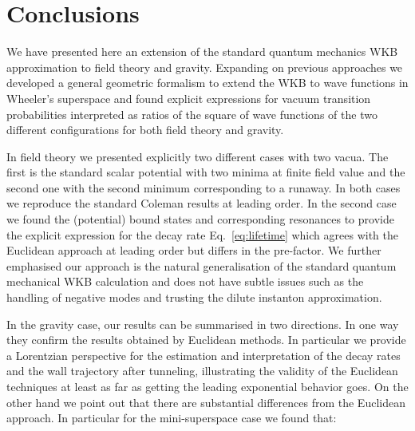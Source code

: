\documentclass[a4paper,11pt]{article}
\numberwithin{equation}{section}
\begin{document}
\section{Conclusions}

We have presented here an extension of the standard quantum mechanics WKB approximation to field theory and gravity. Expanding on previous approaches we developed a general geometric formalism to extend the WKB to wave functions in Wheeler's superspace and found explicit expressions for vacuum transition probabilities interpreted as ratios of the square of wave functions of the two different configurations for both field theory and gravity. 

In field theory we presented explicitly two different cases with two vacua. The first is the standard scalar potential with two minima at finite field value and the second one with the second minimum corresponding to a runaway. In both cases we reproduce the standard Coleman results at leading order. In the second case we  found the (potential) bound states and corresponding resonances to provide the explicit expression for the decay rate Eq.~\eqref{eq:lifetime} which agrees with the Euclidean approach at leading order but differs in the pre-factor. We further emphasised our approach is the natural generalisation of the standard quantum mechanical WKB calculation and does not have subtle issues such as the  handling of negative modes and trusting the dilute instanton approximation.

 In the gravity case, our results can be summarised in two directions. In one way they confirm the results obtained by Euclidean methods. In particular we provide a Lorentzian perspective for the estimation and interpretation of the decay rates and the wall trajectory after tunneling, illustrating the validity of the Euclidean techniques at least as far as getting the leading exponential behavior goes. On the other hand we point out that there are substantial differences from the Euclidean approach. In particular for the mini-superspace case we found that:
 
\end{document}
